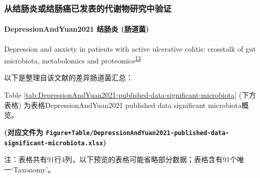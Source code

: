 \documentclass[
]{article}
\begin{document}
\hypertarget{valids}{%
\subsubsection{从结肠炎或结肠癌已发表的代谢物研究中验证}\label{valids}}

\hypertarget{depressionandyuan2021-ux7ed3ux80a0ux708e-ux80a0ux9053ux83cc}{%
\paragraph{DepressionAndYuan2021 结肠炎 (肠道菌)}\label{depressionandyuan2021-ux7ed3ux80a0ux708e-ux80a0ux9053ux83cc}}

Depression and anxiety in patients with active ulcerative colitis: crosstalk of gut microbiota, metabolomics and proteomics\textsuperscript{\protect\hyperlink{ref-DepressionAndYuan2021}{13}}

以下是整理自该文献的差异肠道菌汇总：

Table \ref{tab:DepressionAndYuan2021-published-data-significant-microbiota} (下方表格) 为表格DepressionAndYuan2021 published data significant microbiota概览。

\textbf{(对应文件为 \texttt{Figure+Table/DepressionAndYuan2021-published-data-significant-microbiota.xlsx})}

\begin{center}\begin{tcolorbox}[colback=gray!10, colframe=gray!50, width=0.9\linewidth, arc=1mm, boxrule=0.5pt]注：表格共有91行4列，以下预览的表格可能省略部分数据；表格含有91个唯一`Taxonomy'。
\end{tcolorbox}
\end{center}
\end{document}

